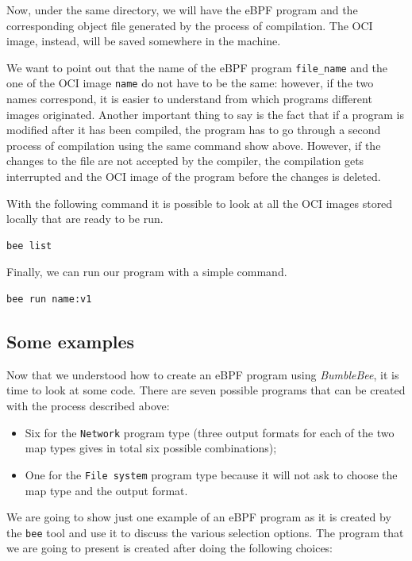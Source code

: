 Now, under the same directory, we will have the eBPF program and the corresponding object file generated by the process of compilation.
The OCI image, instead, will be saved somewhere in the machine.

We want to point out that the name of the eBPF program \verb|file_name| and the one of the OCI image \verb|name| do not have to be the same: however, if the two names correspond, it is easier to understand from which programs different images originated.
Another important thing to say is the fact that if a program is modified after it has been compiled, the program has to go through a second process of compilation using the same command show above.
However, if the changes to the file are not accepted by the compiler, the compilation gets interrupted and the OCI image of the program before the changes is deleted.

With the following command it is possible to look at all the OCI images stored locally that are ready to be run.

\begin{lstlisting}[language=bash, caption={bee list command}]
	bee list
\end{lstlisting}

Finally, we can run our program with a simple command.

\begin{lstlisting}[language=bash, caption={bee run command}]
	bee run name:v1
\end{lstlisting}

\subsection{Some examples}

Now that we understood how to create an eBPF program using \textit{BumbleBee}, it is time to look at some code.
There are seven possible programs that can be created with the process described above:

\begin{itemize}
	\item Six for the \verb|Network| program type (three output formats for each of 
		the two map types gives in total six possible combinations);
	\item One for the \verb|File system| program type because it will not ask to
		choose the map type and the output format.
\end{itemize}

We are going to show just one example of an eBPF program as it is created by the \verb|bee| tool and use it to discuss the various selection options.
The program that we are going to present  is created after doing the following choices:

